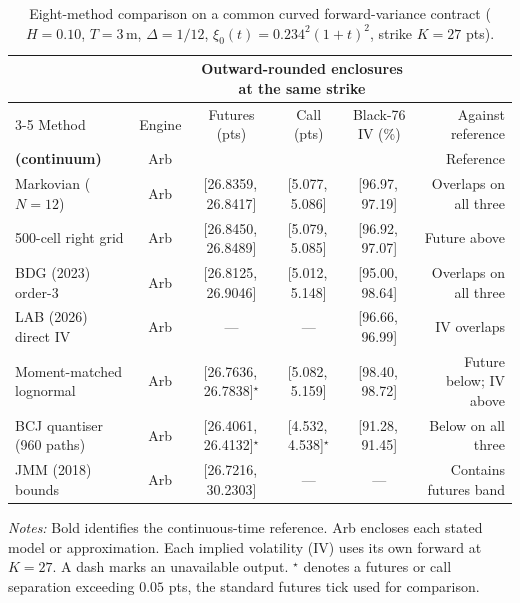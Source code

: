 \begin{table}[!htbp]\centering\scriptsize\setlength{\tabcolsep}{3.4pt}
\caption{Eight-method comparison on a common curved forward-variance contract ($H=0.10$, $T=3$\,m, $\Delta=1/12$, $\xi_0(t)=0.234^2(1+t)^2$, strike $K=27$ pts).}\label{tab:common}
\begin{tabular}{@{}lccccr@{}}\toprule
 & & \multicolumn{3}{c}{Outward-rounded enclosures at the same strike} & \\
\cmidrule(lr){3-5}
Method & Engine & Futures (pts) & Call (pts) & Black-76 IV (\%) & Against reference \\\midrule
\textbf{\RoughCertCV{} (continuum)} & Arb & \textbf{\boldmath [26.8389,\,26.8441]} & \textbf{\boldmath [5.078,\,5.085]} & \textbf{\boldmath [96.95,\,97.14]} & Reference \\
Markovian ($N=12$) & Arb & [26.8359,\,26.8417] & [5.077,\,5.086] & [96.97,\,97.19] & Overlaps on all three \\
500-cell right grid & Arb & [26.8450,\,26.8489] & [5.079,\,5.085] & [96.92,\,97.07] & Future above \\
BDG (2023) order-3 & Arb & [26.8125,\,26.9046] & [5.012,\,5.148] & [95.00,\,98.64] & Overlaps on all three \\
LAB (2026) direct IV & Arb & --- & --- & [96.66,\,96.99] & IV overlaps \\
Moment-matched lognormal & Arb & [26.7636,\,26.7838]$^\star$ & [5.082,\,5.159] & [98.40,\,98.72] & Future below; IV above \\
BCJ quantiser (960 paths) & Arb & [26.4061,\,26.4132]$^\star$ & [4.532,\,4.538]$^\star$ & [91.28,\,91.45] & Below on all three \\
JMM (2018) bounds & Arb & [26.7216,\,30.2303] & --- & --- & Contains futures band \\
\bottomrule\end{tabular}
\smallskip\par\raggedright\scriptsize\emph{Notes:} Bold identifies the continuous-time reference. Arb encloses each stated model or approximation. Each implied volatility (IV) uses its own forward at $K=27$. A dash marks an unavailable output. $^\star$ denotes a futures or call separation exceeding $0.05$ pts, the standard futures tick used for comparison.
\end{table}
